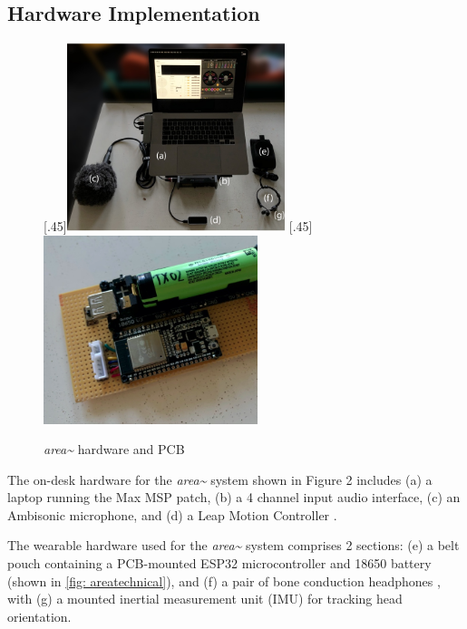 \subsection{Hardware Implementation}            \label{sec: area-system-hardware}
\begin{figure}
    \centering
    \subcaptionbox*{}[.45\textwidth]{\includegraphics[height=5.5cm]{figures/05-area/areatechnical_hardware.png}}%
    \hfill
    \subcaptionbox*{}[.45\textwidth]{\includegraphics[height=5.5cm]{figures/05-area/areatechnical_pcb.png}}%
    \caption{\textit{area\textasciitilde{}} hardware and PCB}
    \label{fig: areatechnical}
\end{figure}

The on-desk hardware for the \textit{area\textasciitilde{}} system shown in Figure 2 includes (a) a laptop running the Max MSP \citep{cycling742020} patch, (b) a 4 channel input audio interface, (c) an Ambisonic microphone, and (d) a Leap Motion Controller \citep{ultraleap2020}.

The wearable hardware used for the \textit{area\textasciitilde{}} system comprises 2 sections: (e) a belt pouch containing a PCB-mounted ESP32 microcontroller \citep{espressif2020} and 18650 battery (shown in \autoref{fig: areatechnical}), and (f) a pair of bone conduction headphones \citep{aftershokz2020}, with (g) a mounted inertial measurement unit (IMU) for tracking head orientation. 


